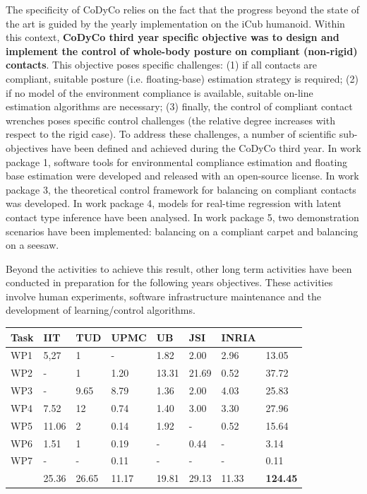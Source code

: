 \documentclass[12pt,a4paper,twoside]{article}
\begin{document}
The specificity of CoDyCo relies on the fact that the progress beyond the state of the art is guided by the yearly implementation on the iCub humanoid. Within this context, \textbf{CoDyCo third year specific objective was to design and implement the control of whole-body posture on compliant (non-rigid) contacts}. This objective poses specific challenges: (1) if all contacts are compliant, suitable posture (i.e. floating-base) estimation strategy is required; (2) if no model of the environment compliance is available, suitable on-line estimation algorithms are necessary; (3) finally, the control of compliant contact wrenches poses specific control challenges (the relative degree increases with respect to the rigid case). To address these challenges, a number of scientific sub-objectives have been defined and achieved during the CoDyCo third year. In work package 1, software tools for environmental compliance estimation and floating base estimation were developed and released with an open-source license. In work package 3, the theoretical control framework for balancing on compliant contacts was developed. In work package 4, models for real-time regression with latent contact type inference have been analysed. In work package 5, two demonstration scenarios have been implemented: balancing on a compliant carpet and balancing on a seesaw. 

Beyond the activities to achieve this result, other long term activities have been conducted in preparation for the following years objectives. These activities involve human experiments, software infrastructure maintenance and the development of learning/control algorithms.

\begin{longtable}{|C{1.5cm}|C{1.5cm}|C{1.5cm}|C{1.5cm}|C{1.5cm}|C{1.5cm}|C{1.5cm}|C{1.5cm}|}
\footnotesize \textbf{Task}& \footnotesize \textbf{IIT}&\footnotesize \textbf{TUD}&\footnotesize \textbf{UPMC}& \footnotesize \textbf{UB} &\footnotesize \textbf{JSI} &\footnotesize \textbf{INRIA} &  \\ \hline
\footnotesize WP1      &  5,27     &  1      &  -      &  1.82   &  2.00  &  2.96  &  13.05\\  \hline
\footnotesize WP2      &  -        &  1      &  1.20   &  13.31  &  21.69 &  0.52  &  37.72\\  \hline
\footnotesize WP3      &  -        &  9.65   &  8.79   &  1.36   &  2.00  &  4.03  &  25.83\\  \hline
\footnotesize WP4      &  7.52     &  12     &  0.74   &  1.40   &  3.00  &  3.30  &  27.96\\  \hline
\footnotesize WP5      &  11.06    &  2      &  0.14   &  1.92   &  -     &  0.52  &  15.64\\  \hline
\footnotesize WP6      &  1.51     &  1      &  0.19   &  -      &  0.44  &  -     &   3.14\\  \hline
\footnotesize WP7      &  -        &  -      &  0.11   &  -      &  -     &  -     &   0.11\\  \hline
{}  &  25.36    &  26.65  &  11.17  &  19.81  &  29.13 &  11.33 &  \textbf{124.45}     \\  
\end{longtable}
\end{document}
